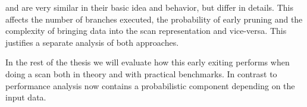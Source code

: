 \bwv{} and \bs{} are very similar in their basic idea and behavior, but differ in
details. This affects the number of branches executed, the probability of early
pruning and the complexity of bringing data into the scan representation and
vice-versa. This justifies a separate analysis of both approaches.

In the rest of the thesis we will evaluate how this early exiting performs when
doing a scan both in theory and with practical benchmarks. In contrast to
\simdscan{} performance analysis now contains a probabilistic component
depending on the input data.
